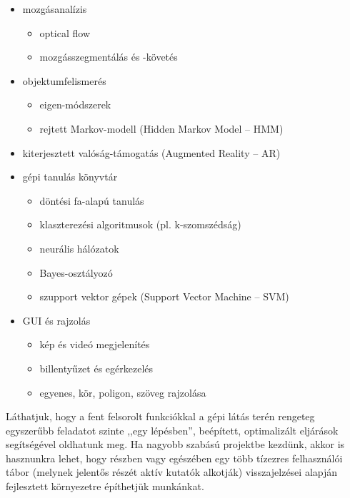 \begin{itemize}
 \item mozgásanalízis
  \begin{itemize}
   \item optical flow
   \item mozgásszegmentálás és -követés
  \end{itemize}

 \item objektumfelismerés
  \begin{itemize}
   \item eigen-módszerek
   \item rejtett Markov-modell (Hidden Markov Model -- HMM)
  \end{itemize}
  
  \item kiterjesztett valóság-támogatás (Augmented Reality -- AR)
  
  \item gépi tanulás könyvtár
  \begin{itemize}
    \item döntési fa-alapú tanulás
    \item klaszterezési algoritmusok (pl. k-szomszédság)
    \item neurális hálózatok
    \item Bayes-osztályozó
    \item szupport vektor gépek (Support Vector Machine -- SVM)
  \end{itemize}    
  
 \item GUI és rajzolás
  \begin{itemize}
   \item kép és videó megjelenítés
   \item billentyűzet és egérkezelés
   \item egyenes, kör, poligon, szöveg rajzolása
  \end{itemize}
  
\end{itemize}

Láthatjuk, hogy a fent felsorolt funkciókkal a gépi látás terén rengeteg egyszerűbb feladatot szinte ,,egy lépésben'', beépített, optimalizált eljárások segítségével oldhatunk meg. Ha nagyobb szabású projektbe kezdünk, akkor is hasznunkra lehet, hogy részben vagy egészében egy több tízezres felhasználói tábor (melynek jelentős részét aktív kutatók alkotják) visszajelzései alapján fejlesztett környezetre építhetjük munkánkat.

\bigskip

